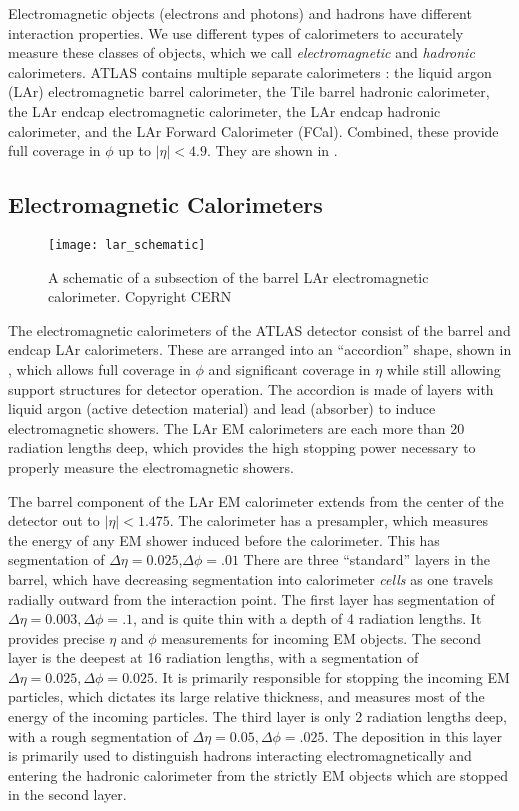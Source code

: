 Electromagnetic objects (electrons and photons) and hadrons have different interaction properties.
We use different types of calorimeters to accurately measure these classes of objects, which we call \textit{electromagnetic} and \textit{hadronic} calorimeters.
ATLAS contains multiple separate calorimeters : the liquid argon (LAr) electromagnetic barrel calorimeter, the Tile barrel hadronic calorimeter, the LAr endcap electromagnetic calorimeter, the LAr endcap hadronic calorimeter, and the LAr Forward Calorimeter (FCal).
Combined, these provide full coverage in $\phi$ up to $|\eta| <4.9$.
They are shown in .

\subsection{Electromagnetic Calorimeters}
\begin{figure}[tbp]
\caption{A schematic of a subsection of the barrel LAr electromagnetic calorimeter. Copyright CERN} \label{fig:lar_schematic}
\texttt{[image: lar\_schematic]}
\end{figure}

The electromagnetic calorimeters of the ATLAS detector consist of the barrel and endcap LAr calorimeters.
These are arranged into an ``accordion'' shape, shown in , which allows full coverage in $\phi$ and significant coverage in $\eta$ while still allowing support structures for detector operation.
The accordion is made of layers with liquid argon (active detection material) and lead (absorber) to induce electromagnetic showers.
The LAr EM calorimeters are each more than 20 radiation lengths deep, which provides the high stopping power necessary to properly measure the electromagnetic showers.

The barrel component of the LAr EM calorimeter extends from the center of the detector out to $| \eta| <  1.475 $.
The calorimeter has a presampler, which measures the energy of any EM shower induced before the calorimeter.
This has segmentation of $\Delta\eta = 0.025$,$ \Delta\phi = .01$
There are three ``standard'' layers in the barrel, which have decreasing segmentation into calorimeter \textit{cells} as one travels radially outward from the interaction point.
The first layer has segmentation of $\Delta\eta = 0.003, \Delta\phi = .1$, and is quite thin with a depth of 4 radiation lengths.
It provides precise $\eta$ and $\phi$ measurements for incoming EM objects.
The second layer is the deepest at 16 radiation lengths, with a segmentation of $\Delta\eta = 0.025, \Delta\phi = 0.025$.
It is primarily responsible for stopping the incoming EM particles, which dictates its large relative thickness, and measures most of the energy of the incoming particles.
The third layer is only 2 radiation lengths deep, with a rough segmentation of $\Delta\eta = 0.05, \Delta\phi = .025$.
The deposition in this layer is primarily used to distinguish hadrons interacting electromagnetically and entering the hadronic calorimeter from the strictly EM objects which are stopped in the second layer.

